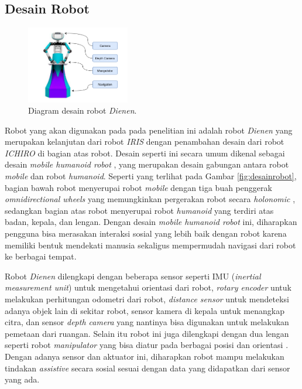 \subsection{Desain Robot}
\label{subsec:robotdesign}

\begin{figure} [ht]
  \centering
  \includegraphics[width=0.4\textwidth]{images/robot-design.png}
  \caption{Diagram desain robot \emph{Dienen}.}
  \label{fig:robotdesign}
\end{figure}

Robot yang akan digunakan pada pada penelitian ini adalah robot \emph{Dienen} yang merupakan kelanjutan dari robot \emph{IRIS} \citep{dikairono2020}\citep{zanuar2019} dengan penambahan desain dari robot \emph{ICHIRO} \citep{muhtadin2019} di bagian atas robot.
Desain seperti ini secara umum dikenal sebagai desain \emph{mobile humanoid robot} \citep{mohamed2012},
  yang merupakan desain gabungan antara robot \emph{mobile} dan robot \emph{humanoid}.
Seperti yang terlihat pada Gambar \ref{fig:desainrobot},
  bagian bawah robot menyerupai robot \emph{mobile} dengan tiga buah penggerak \emph{omnidirectional wheels} yang memungkinkan pergerakan robot secara \emph{holonomic} \citep{oliveira2008},
  sedangkan bagian atas robot menyerupai robot \emph{humanoid} yang terdiri atas badan, kepala, dan lengan.
Dengan desain \emph{mobile humanoid robot} ini,
  diharapkan pengguna bisa merasakan interaksi sosial yang lebih baik dengan robot karena memiliki bentuk mendekati manusia \citep{rossi2018} sekaligus mempermudah navigasi dari robot ke berbagai tempat.

Robot \emph{Dienen} dilengkapi dengan beberapa sensor seperti IMU (\emph{inertial measurement unit}) untuk mengetahui orientasi dari robot,
  \emph{rotary encoder} untuk melakukan perhitungan odometri dari robot,
  \emph{distance sensor} untuk mendeteksi adanya objek lain di sekitar robot, sensor kamera di kepala untuk menangkap citra,
  dan sensor \emph{depth camera} yang nantinya bisa digunakan untuk melakukan pemetaan dari ruangan.
Selain itu robot ini juga dilengkapi dengan dua lengan seperti robot \emph{manipulator} yang bisa diatur pada berbagai posisi dan orientasi \citep{iqbal2012}.
Dengan adanya sensor dan aktuator ini,
  diharapkan robot mampu melakukan tindakan \emph{assistive} secara sosial sesuai dengan data yang didapatkan dari sensor yang ada.
